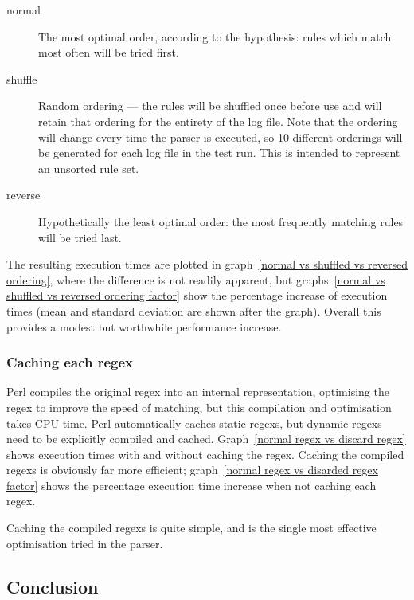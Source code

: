 \documentclass[a4paper,12pt,draft]{article}
\begin{document}
\begin{description}

    \item [normal]  The most optimal order, according to the hypothesis:
        rules which match most often will be tried first.

    \item [shuffle] Random ordering --- the rules will be shuffled once
        before use and will retain that ordering for the entirety of the
        log file.  Note that the ordering will change every time the parser
        is executed, so 10 different orderings will be generated for each
        log file in the test run.  This is intended to represent an
        unsorted rule set.

    \item [reverse] Hypothetically the least optimal order: the most
        frequently matching rules will be tried last.

\end{description}


The resulting execution times are plotted in graph~\ref{normal vs shuffled
vs reversed ordering}, where the difference is not readily apparent, but
graphs~\ref{normal vs shuffled vs reversed ordering factor} show the
percentage increase of execution times (mean and standard deviation are
shown after the graph).  Overall this provides a modest but worthwhile
performance increase.

\subsubsection{Caching each regex}

Perl compiles the original regex into an internal representation,
optimising the regex to improve the speed of matching, but this compilation
and optimisation takes CPU time.  Perl automatically caches static regexs,
but dynamic regexs need to be explicitly compiled and cached.
Graph~\ref{normal regex vs discard regex} shows execution times with and
without caching the regex.  Caching the compiled regexs is obviously far
more efficient; graph~\ref{normal regex vs disarded regex factor} shows the
percentage execution time increase when not caching each regex.

Caching the compiled regexs is quite simple, and is the single most
effective optimisation tried in the parser.

\subsection{Conclusion}
\end{document}
